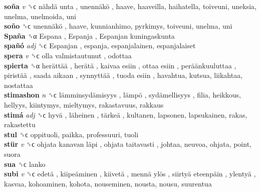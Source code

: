 \textbf{soña} \emph{v}  ␝ϲ   nähdä unta ,  unennäkö , haave, haaveilla, haihatella, toiveuni, uneksia, unelma, unelmoida, uni  \\
\textbf{soño} ␝ϲ   unennäkö , haave, kunnianhimo, pyrkimys, toiveuni, unelma, uni  \\
\textbf{Spaña} ␝α   Espana ,  Espanja ,  Espanjan kuningaskunta   \\
\textbf{spañó} \emph{adj}  ␝ϲ   Espanjan , espanja, espanjalainen, espanjalaiset  \\
\textbf{spera} \emph{v}  ␝ϲ   olla valmistautunut , odottaa  \\
\textbf{spierta} ␝α   herättää ,  herätä ,  kaivaa esiin ,  ottaa esiin ,  peräänkuuluttaa ,  piristää ,  saada aikaan ,  synnyttää ,  tuoda esiin , havahtua, kutsua, liikahtaa, nostattaa  \\
\textbf{stimashon} \emph{n}  ␝ϲ   lämminsydämisyys ,  lämpö ,  sydämellisyys , filia, heikkous, hellyys, kiintymys, mieltymys, rakastavuus, rakkaus  \\
\textbf{stimá} \emph{adj}  ␝ϲ   hyvä ,  läheinen ,  tärkeä , kultanen, lapsonen, lapsukainen, rakas, rakastettu  \\
\textbf{stul} ␝ϲ  oppituoli, paikka, professuuri, tuoli  \\
\textbf{stür} \emph{v}  ␝ϲ   ohjata kanavan läpi ,  ohjata taitavasti , johtaa, neuvoa, ohjata, point, suora  \\
\textbf{sua} ␝ϲ  lanko  \\
\textbf{subi} \emph{v}  ␝ϲ   edetä ,  kiipeäminen ,  kiivetä ,  mennä ylös ,  siirtyä eteenpäin ,  ylentyä , kasvaa, kohoaminen, kohota, nouseminen, nousta, nousu, suurentua  \\
